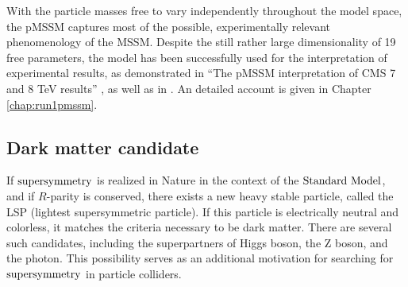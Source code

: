 With the particle masses free to vary independently throughout the model space, the pMSSM captures most of the possible, experimentally relevant phenomenology of the MSSM.  Despite the still rather large dimensionality of 19 free parameters, the model has been successfully used for the interpretation of experimental results, as demonstrated in ``The pMSSM interpretation of CMS 7 and 8 TeV results'' \cite{me!}, as well as in \cite{Carena:2012he, Aad:2015baa}. An detailed account is given in Chapter \ref{chap:run1pmssm}.

\subsection{Dark matter candidate}
If $\text{supersymmetry}$ is realized in Nature in the context of the $\text{Standard\ Model}$, and if $R$-parity is conserved, there exists a new heavy stable particle, called the LSP (lightest supersymmetric particle). If this particle is electrically neutral and colorless, it matches the criteria necessary to be dark matter. There are several such candidates, including the superpartners of Higgs boson, the Z boson, and the photon. This possibility serves as an additional motivation for searching for $\text{supersymmetry}$ in particle colliders. 
